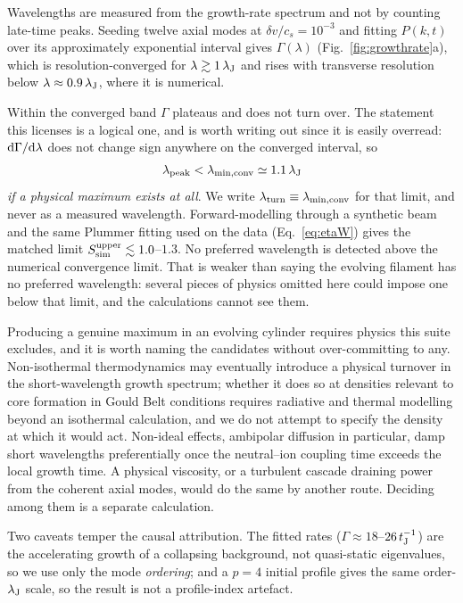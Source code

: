 \documentclass[usenatbib,twoside,twocolumn]{mnras}
\begin{document}
Wavelengths are measured from the growth-rate spectrum and not by counting late-time peaks. Seeding twelve axial modes at $\delta v/c_s=10^{-3}$ and fitting $P(k,t)$ over its approximately exponential interval gives $\Gamma(\lambda)$ (Fig.~\ref{fig:growthrate}a), which is resolution-converged for $\lambda\gtrsim1\,\lambda_{\rm J}$ and rises with transverse resolution below $\lambda\approx0.9\,\lambda_{\rm J}$, where it is numerical.

Within the converged band $\Gamma$ plateaus and does not turn over. The statement this licenses is a logical one, and is worth writing out since it is easily overread: ${\rm d}\Gamma/{\rm d}\lambda$ does not change sign anywhere on the converged interval, so
\begin{equation}
\lambda_{\rm peak}<\lambda_{\rm min,conv}\simeq1.1\,\lambda_{\rm J}
\label{eq:bound}
\end{equation}
\emph{if a physical maximum exists at all}. We write $\lambda_{\rm turn}\equiv\lambda_{\rm min,conv}$ for that limit, and never as a measured wavelength. Forward-modelling through a synthetic beam and the same Plummer fitting used on the data (Eq.~\ref{eq:etaW}) gives the matched limit $S_{\rm sim}^{\rm upper}\lesssim1.0$--$1.3$. No preferred wavelength is detected above the numerical convergence limit. That is weaker than saying the evolving filament has no preferred wavelength: several pieces of physics omitted here could impose one below that limit, and the calculations cannot see them.

Producing a genuine maximum in an evolving cylinder requires physics this suite excludes, and it is worth naming the candidates without over-committing to any. Non-isothermal thermodynamics may eventually introduce a physical turnover in the short-wavelength growth spectrum; whether it does so at densities relevant to core formation in Gould Belt conditions requires radiative and thermal modelling beyond an isothermal calculation, and we do not attempt to specify the density at which it would act. Non-ideal effects, ambipolar diffusion in particular, damp short wavelengths preferentially once the neutral--ion coupling time exceeds the local growth time. A physical viscosity, or a turbulent cascade draining power from the coherent axial modes, would do the same by another route. Deciding among them is a separate calculation.

Two caveats temper the causal attribution. The fitted rates ($\Gamma\approx18$--$26\,t_{\rm J}^{-1}$) are the accelerating growth of a collapsing background, not quasi-static eigenvalues, so we use only the mode \emph{ordering}; and a $p=4$ initial profile gives the same order-$\lambda_{\rm J}$ scale, so the result is not a profile-index artefact.
\end{document}
